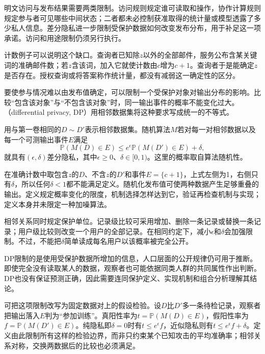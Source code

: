 明文访问与发布结果需要两类限制。访问规则规定谁可读取和操作，协作计算规则规定参与者可见哪些中间状态；二者都未必控制获准取得的统计量或模型透露了多少私人信息。差分隐私进一步限制受保护数据如何改变发布分布，用于补足这一项承诺。访问和用途限制仍须另行执行。

计数例子可以说明这个缺口。查询者已知除$z$以外的全部邮件，服务公布含某关键词的准确邮件数；若$z$含该词，加入它就使计数由$c$增为$c+1$。查询者于是能确定$z$是否存在。授权查询或将答案称作统计量，都没有减弱这一确定性的区分。

要使参与情况难以由发布值确定，可以限制一个受保护对象对输出分布的影响。比较“包含该对象”与“不包含该对象”时，同一输出事件的概率不能变化过大。（differential privacy, DP）用相邻数据集将这种要求写成统一的不等式。

\begin{definition}[差分隐私]
\label{def:privacy-dp}
用与第一卷相同的$D\sim D'$表示相邻数据集。随机算法$M$若对每一对相邻数据以及每一个可测输出事件$E$满足
\begin{equation}
 \mathbb P(M(D)\in E)
 \leq e^\epsilon\mathbb P(M(D')\in E)+\delta,
 \label{eq:privacy-definition}
\end{equation}
就具有$(\epsilon,\delta)$差分隐私，其中$\epsilon\geq0$、$\delta\in[0,1)$。这里的概率取自算法随机性。
\end{definition}

在准确计数中取包含$z$的$D$、不含$z$的$D'$和事件$E=\{c+1\}$，上式左侧为1，右侧只有$\delta$，所以任何$\delta<1$都不能满足定义。随机化发布值可使两种数据产生足够重叠的输出。定义规定概率变化的限度，机制选择怎样达到它，验证再检查机制与实现；定义本身并未限定一种加噪算法。

相邻关系同时规定保护单位。记录级比较可采用增加、删除一条记录或替换一条记录；用户级比较则改变一个用户的全部记录。在相同约定下，减小$\epsilon$和$\delta$会加强限制。不过，不能把$\delta$简单读成每名用户以该概率被完全公开。

DP限制的是使用受保护数据所增加的信息，人口层面的公开规律仍可用于推断。即使完全没有读取某人的数据，观察者也可能依据同类人群的共同属性作出判断。DP也没有保证预测正确，因此需要连同保护定义、实现机制和组合分析理解其结论。

可把这项限制改写为固定数据对上的假设检验。设$D$比$D'$多一条待检记录，观察者把输出落入$E$判为“参加训练”。真阳性率为$t=\mathbb P(M(D)\in E)$，假阳性率为$f=\mathbb P(M(D')\in E)$。纯隐私即$\delta=0$时有$t\leq e^\epsilon f$，近似隐私则有$t\leq e^\epsilon f+\delta$。定义由此限制所有这样的检验边界，而非只约束某个已知攻击的平均准确率；相邻关系对称，交换两数据后的比较也必须满足。

